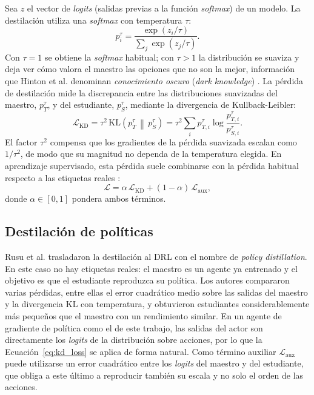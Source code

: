 Sea $z$ el vector de \textit{logits} (salidas previas a la función \textit{softmax}) de un modelo. La destilación utiliza una \textit{softmax} con temperatura $\tau$:
\begin{equation}\label{eq:softmax_temp}
	p_i^{\tau} = \frac{\exp(z_i / \tau)}{\sum_j \exp(z_j / \tau)} .
\end{equation}
Con $\tau = 1$ se obtiene la \textit{softmax} habitual; con $\tau > 1$ la distribución se suaviza y deja ver cómo valora el maestro las opciones que no son la mejor, información que Hinton et al. denominan \textit{conocimiento oscuro} (\textit{dark knowledge}) \cite{hinton2015distilling}. La pérdida de destilación mide la discrepancia entre las distribuciones suavizadas del maestro, $p^{\tau}_{T}$, y del estudiante, $p^{\tau}_{S}$, mediante la divergencia de Kullback-Leibler:
\begin{equation}\label{eq:kd_loss}
	\mathcal{L}_{\text{KD}} = \tau^{2}\, \mathrm{KL}\left(p^{\tau}_{T} \,\middle\|\, p^{\tau}_{S}\right) = \tau^{2} \sum_i p^{\tau}_{T,i} \log \frac{p^{\tau}_{T,i}}{p^{\tau}_{S,i}} .
\end{equation}
El factor $\tau^{2}$ compensa que los gradientes de la pérdida suavizada escalan como $1/\tau^{2}$, de modo que su magnitud no dependa de la temperatura elegida. En aprendizaje supervisado, esta pérdida suele combinarse con la pérdida habitual respecto a las etiquetas reales \cite{hinton2015distilling}:
\begin{equation}\label{eq:kd_total}
	\mathcal{L} = \alpha\, \mathcal{L}_{\text{KD}} + (1 - \alpha)\, \mathcal{L}_{\text{aux}},
\end{equation}
donde $\alpha \in [0,1]$ pondera ambos términos.

\subsection{Destilación de políticas}

Rusu et al. \cite{rusu2016policy} trasladaron la destilación al DRL con el nombre de \textit{policy distillation}. En este caso no hay etiquetas reales: el maestro es un agente ya entrenado y el objetivo es que el estudiante reproduzca su política. Los autores compararon varias pérdidas, entre ellas el error cuadrático medio sobre las salidas del maestro y la divergencia KL con temperatura, y obtuvieron estudiantes considerablemente más pequeños que el maestro con un rendimiento similar. En un agente de gradiente de política como el de este trabajo, las salidas del actor son directamente los \textit{logits} de la distribución sobre acciones, por lo que la Ecuación~\eqref{eq:kd_loss} se aplica de forma natural. Como término auxiliar $\mathcal{L}_{\text{aux}}$ puede utilizarse un error cuadrático entre los \textit{logits} del maestro y del estudiante, que obliga a este último a reproducir también su escala y no solo el orden de las acciones.


